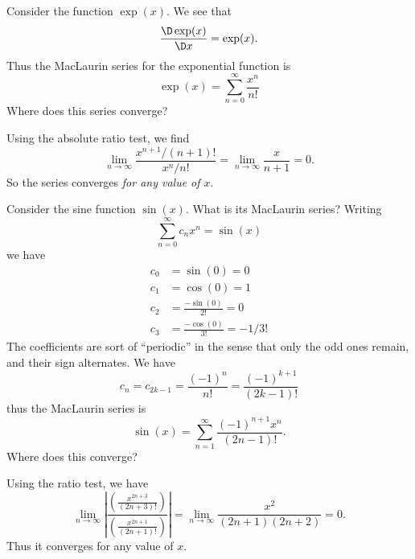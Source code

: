 \begin{example}
Consider the function $\exp(x)$. We see that
\begin{equation}
\frac{\D\exp(x)}{\D x}=\exp(x).
\end{equation}
Thus the MacLaurin series for the exponential function is
\begin{equation}
\exp(x)=\sum^{\infty}_{n=0}\frac{x^{n}}{n!}
\end{equation}
Where does this series converge?

Using the absolute ratio test, we find
\begin{equation}
\lim_{n\to\infty}\frac{x^{n+1}/(n+1)!}{x^{n}/n!} =
\lim_{n\to\infty}\frac{x}{n+1}=0.
\end{equation}
So the series converges \emph{for any value of $x$}.
\end{example}
\begin{example}
Consider the sine function $\sin(x)$. What is its MacLaurin
series? Writing
\begin{equation}
\sum^{\infty}_{n=0}c_{n}x^{n}=\sin(x)
\end{equation}
we have
\begin{equation}
\begin{aligned}
c_{0}&=\sin(0)=0\\
c_{1}&=\cos(0)=1\\
c_{2}&=\frac{-\sin(0)}{2!}=0\\
c_{3}&=\frac{-\cos(0)}{3!}=-1/3!
\end{aligned}
\end{equation}
The coefficients are sort of ``periodic'' in the sense that only
the odd ones remain, and their sign alternates. We have
\begin{equation}
c_{n} = c_{2k-1} = \frac{(-1)^{n}}{n!} = \frac{(-1)^{k+1}}{(2k-1)!}
\end{equation}
thus the MacLaurin series is
\begin{equation}
\sin(x)=\sum^{\infty}_{n=1}\frac{(-1)^{n+1}x^{n}}{(2n-1)!}.
\end{equation}
Where does this converge? 

Using the ratio test, we have
\begin{equation}
\lim_{n\to\infty}\left|\frac{\left(\displaystyle\frac{x^{2n+3}}{(2n+3)!}\right)}{\left(\displaystyle\frac{x^{2n+1}}{(2n+1)!}\right)}\right|
=\lim_{n\to\infty}\frac{x^{2}}{(2n+1)(2n+2)} =  0.
\end{equation}
Thus it converges for any value of $x$.
\end{example}


